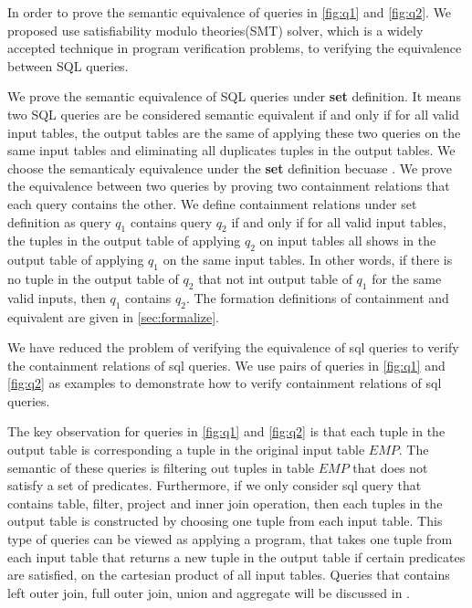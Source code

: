 %
In order to prove the semantic equivalence of queries in \autoref{fig:q1} and \autoref{fig:q2}.
%
We proposed use satisfiability modulo theories(SMT) solver, which is 
a widely accepted technique in program verification problems, to verifying the equivalence between SQL queries.
%

We prove the semantic equivalence of SQL queries under \textbf{set} definition.
%
It means two SQL queries are be considered semantic equivalent if and only if for all valid input tables, 
the output tables are the same of applying these two queries on the same input tables and eliminating all duplicates
tuples in the output tables.
%
We choose the semanticaly equivalence under the \textbf{set} definition becuase .
%
We prove the equivalence between two queries by proving two containment relations that each query contains the other.
%
We define containment relations under set definition as query $q_1$ contains query $q_2$ if and only if
for all valid input tables, the tuples in the output table of applying $q_2$ on input tables all shows in
the output table of applying $q_1$ on the same input tables.
%
In other words, if there is no tuple in the output table of $q_2$ that not int output table of $q_1$ for the same
valid inputs, then $q_1$ contains $q_2$.
%
The formation definitions of containment and equivalent are given in \autoref{sec:formalize}.

%
We have reduced the problem of verifying the equivalence of sql queries to verify the containment relations of sql
queries.
%
We use pairs of queries in \autoref{fig:q1} and \autoref{fig:q2} as examples to demonstrate how to verify 
containment relations of sql queries.
%

The key observation for queries in \autoref{fig:q1} and \autoref{fig:q2} is that each tuple in the output table is
corresponding a tuple in the original input table $EMP$.
%
The semantic of these queries is filtering out tuples in table $EMP$ that does not satisfy a set of predicates.
%
Furthermore, if we only consider sql query that contains table, filter, project and inner join operation, 
then each tuples in the output table is constructed by choosing one tuple
from each input table.
%
This type of queries can be viewed as applying a program, that takes one tuple
from each input table that returns a new tuple in the output table if certain predicates are satisfied, on the 
cartesian product of all input tables.
%
Queries that contains left outer join, full outer join, union and aggregate will be discussed in .


